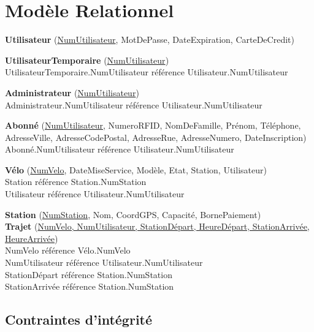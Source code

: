 \documentclass[a4paper,11pt]{report}
\begin{document}
\section{Modèle Relationnel}

\textbf{Utilisateur} (\underline{NumUtilisateur}, MotDePasse, DateExpiration, CarteDeCredit)

\textbf{UtilisateurTemporaire} (\underline{NumUtilisateur})\\
  \phantom{Trajet}UtilisateurTemporaire.NumUtilisateur référence Utilisateur.NumUtilisateur

\textbf{Administrateur} (\underline{NumUtilisateur})\\
  \phantom{Trajet}Administrateur.NumUtilisateur référence Utilisateur.NumUtilisateur

\textbf{Abonné} (\underline{NumUtilisateur}, NumeroRFID, NomDeFamille, Prénom, Téléphone, AdresseVille,   AdresseCodePostal, AdresseRue, AdresseNumero, DateInscription)\\
  \phantom{Trajet}Abonné.NumUtilisateur référence Utilisateur.NumUtilisateur

\textbf{Vélo} (\underline{NumVelo}, DateMiseService, Modèle, Etat, Station, Utilisateur)\\
  \phantom{Trajet}Station référence Station.NumStation\\
  \phantom{Trajet}Utilisateur référence Utilisateur.NumUtilisateur

\textbf{Station} (\underline{NumStation}, Nom, CoordGPS, Capacité, BornePaiement)\\

\textbf{Trajet} (\underline{NumVelo, NumUtilisateur, StationDépart, HeureDépart, StationArrivée, HeureArrivée})\\
  \phantom{Trajet}NumVelo référence Vélo.NumVelo\\
  \phantom{Trajet}NumUtilisateur référence Utilisateur.NumUtilisateur\\
  \phantom{Trajet}StationDépart référence Station.NumStation\\
  \phantom{Trajet}StationArrivée référence Station.NumStation
  
  
\subsection{Contraintes d'intégrité}
\end{document}

